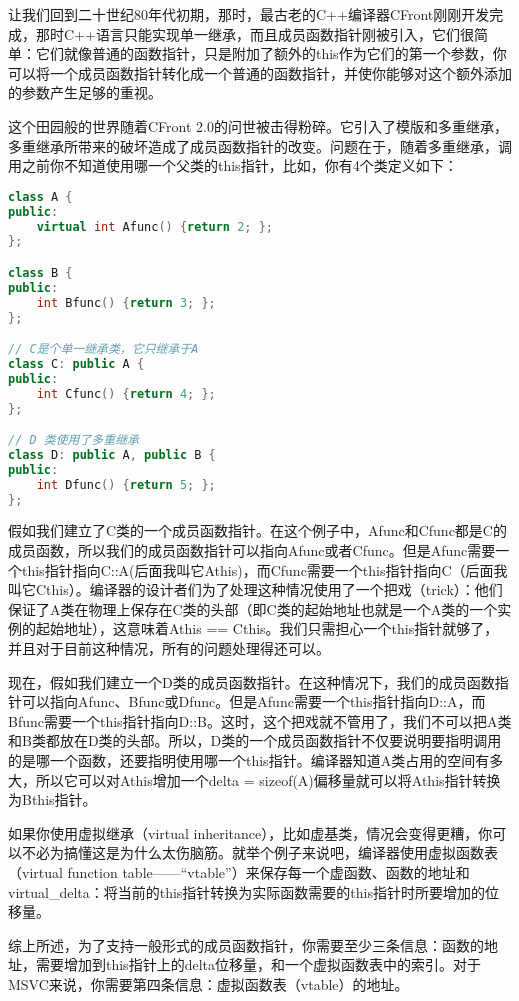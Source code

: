 \documentclass{article}
\begin{document}
\begin{CJK}{UTF8}{gbsn}
让我们回到二十世纪80年代初期，那时，最古老的C++编译器CFront刚刚开发完成，那时C++语言只能实现单一继承，而且成员函数指针刚被引入，它们很简单：它们就像普通的函数指针，只是附加了额外的this作为它们的第一个参数，你可以将一个成员函数指针转化成一个普通的函数指针，并使你能够对这个额外添加的参数产生足够的重视。

这个田园般的世界随着CFront 2.0的问世被击得粉碎。它引入了模版和多重继承，多重继承所带来的破坏造成了成员函数指针的改变。问题在于，随着多重继承，调用之前你不知道使用哪一个父类的this指针，比如，你有4个类定义如下：
\begin{lstlisting}[language=c++]
class A {
public:
    virtual int Afunc() {return 2; };
};

class B {
public: 
    int Bfunc() {return 3; };
};

// C是个单一继承类，它只继承于A
class C: public A {
public: 
    int Cfunc() {return 4; };
};

// D 类使用了多重继承
class D: public A, public B {
public: 
    int Dfunc() {return 5; };
};
\end{lstlisting}
假如我们建立了C类的一个成员函数指针。在这个例子中，Afunc和Cfunc都是C的成员函数，所以我们的成员函数指针可以指向Afunc或者Cfunc。但是Afunc需要一个this指针指向C::A(后面我叫它Athis)，而Cfunc需要一个this指针指向C（后面我叫它Cthis）。编译器的设计者们为了处理这种情况使用了一个把戏（trick）：他们保证了A类在物理上保存在C类的头部（即C类的起始地址也就是一个A类的一个实例的起始地址），这意味着Athis == Cthis。我们只需担心一个this指针就够了，并且对于目前这种情况，所有的问题处理得还可以。

现在，假如我们建立一个D类的成员函数指针。在这种情况下，我们的成员函数指针可以指向Afunc、Bfunc或Dfunc。但是Afunc需要一个this指针指向D::A，而Bfunc需要一个this指针指向D::B。这时，这个把戏就不管用了，我们不可以把A类和B类都放在D类的头部。所以，D类的一个成员函数指针不仅要说明要指明调用的是哪一个函数，还要指明使用哪一个this指针。编译器知道A类占用的空间有多大，所以它可以对Athis增加一个delta = sizeof(A)偏移量就可以将Athis指针转换为Bthis指针。

如果你使用虚拟继承（virtual inheritance），比如虚基类，情况会变得更糟，你可以不必为搞懂这是为什么太伤脑筋。就举个例子来说吧，编译器使用虚拟函数表（virtual function table——“vtable”）来保存每一个虚函数、函数的地址和virtual\_delta：将当前的this指针转换为实际函数需要的this指针时所要增加的位移量。

综上所述，为了支持一般形式的成员函数指针，你需要至少三条信息：函数的地址，需要增加到this指针上的delta位移量，和一个虚拟函数表中的索引。对于MSVC来说，你需要第四条信息：虚拟函数表（vtable）的地址。


\end{CJK}
\end{document}

